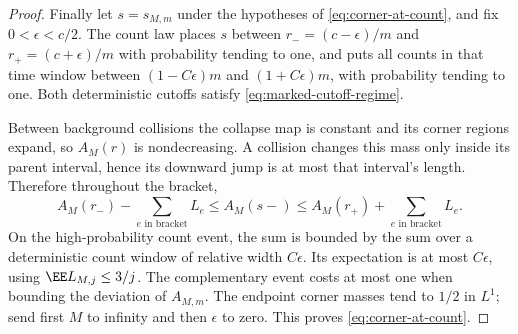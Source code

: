\documentclass[11pt,letterpaper]{article}
\begin{document}
\begin{proof}
Finally let $s=s_{M,m}$ under the hypotheses of
\eqref{eq:corner-at-count}, and fix $0<\epsilon<c/2$.
The count law places $s$ between $r_-=(c-\epsilon)/m$ and
$r_+=(c+\epsilon)/m$ with probability tending to one, and puts all
counts in that time window between
$(1-C\epsilon)m$ and $(1+C\epsilon)m$, with probability tending to one.
Both deterministic cutoffs satisfy \eqref{eq:marked-cutoff-regime}.

Between background collisions the collapse map is constant and its
corner regions expand, so $A_M(r)$ is nondecreasing. A collision
changes this mass only inside its parent interval, hence its downward
jump is at most that interval's length. Therefore throughout the
bracket,
\[
 A_M(r_-)-\sum_{e\text{ in bracket}}L_e
 \le A_M(s-)\le
 A_M(r_+)+\sum_{e\text{ in bracket}}L_e.
\]
On the high-probability count event, the sum is bounded by the sum
over a deterministic count window of relative width $C\epsilon$.
Its expectation is at most $C\epsilon$, using
$\EE L_{M,j}\le3/j$. The complementary event costs at most one
when bounding the deviation of $A_{M,m}$.
The endpoint corner masses tend to $1/2$ in $L^1$; send first $M$
to infinity and then $\epsilon$ to zero. This proves
\eqref{eq:corner-at-count}.
\end{proof}
\end{document}

